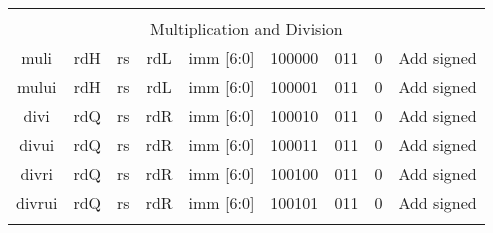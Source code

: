 \documentclass{article}
\begin{document}
\begin{center}
\begin{longtable}{|c|l|r|l|r|l|r|l|r|l|r|l|r|c|c|}
    
    \hline          \multicolumn{15}{|c|}{} \\
    
                    \multicolumn{15}{|c|}{Multiplication and Division} \\   
    \hline muli &   \multicolumn{2}{|c|}{rdH}       &   \multicolumn{2}{|c|}{rs}        &   \multicolumn{2}{|c|}{rdL}       &   \multicolumn{2}{|c|}{imm [6:0]}         &   \multicolumn{2}{|c|}{100000}    &   \multicolumn{2}{|c|}{011}       &   0       &   Add signed \\
    \hline mului &  \multicolumn{2}{|c|}{rdH}       &   \multicolumn{2}{|c|}{rs}        &   \multicolumn{2}{|c|}{rdL}       &   \multicolumn{2}{|c|}{imm [6:0]}         &   \multicolumn{2}{|c|}{100001}    &   \multicolumn{2}{|c|}{011}       &   0       &   Add signed \\
    \hline divi &   \multicolumn{2}{|c|}{rdQ}       &   \multicolumn{2}{|c|}{rs}        &   \multicolumn{2}{|c|}{rdR}       &   \multicolumn{2}{|c|}{imm [6:0]}         &   \multicolumn{2}{|c|}{100010}    &   \multicolumn{2}{|c|}{011}       &   0       &   Add signed \\
    \hline divui &  \multicolumn{2}{|c|}{rdQ}       &   \multicolumn{2}{|c|}{rs}        &   \multicolumn{2}{|c|}{rdR}       &   \multicolumn{2}{|c|}{imm [6:0]}         &   \multicolumn{2}{|c|}{100011}    &   \multicolumn{2}{|c|}{011}       &   0       &   Add signed \\
    \hline divri &  \multicolumn{2}{|c|}{rdQ}       &   \multicolumn{2}{|c|}{rs}        &   \multicolumn{2}{|c|}{rdR}       &   \multicolumn{2}{|c|}{imm [6:0]}         &   \multicolumn{2}{|c|}{100100}    &   \multicolumn{2}{|c|}{011}       &   0       &   Add signed \\
    \hline divrui & \multicolumn{2}{|c|}{rdQ}       &   \multicolumn{2}{|c|}{rs}        &   \multicolumn{2}{|c|}{rdR}       &   \multicolumn{2}{|c|}{imm [6:0]}         &   \multicolumn{2}{|c|}{100101}    &   \multicolumn{2}{|c|}{011}       &   0       &   Add signed \\
    
    
    \hline          \multicolumn{15}{|c|}{} \\
    

\end{longtable}
\end{center}
\end{document}
